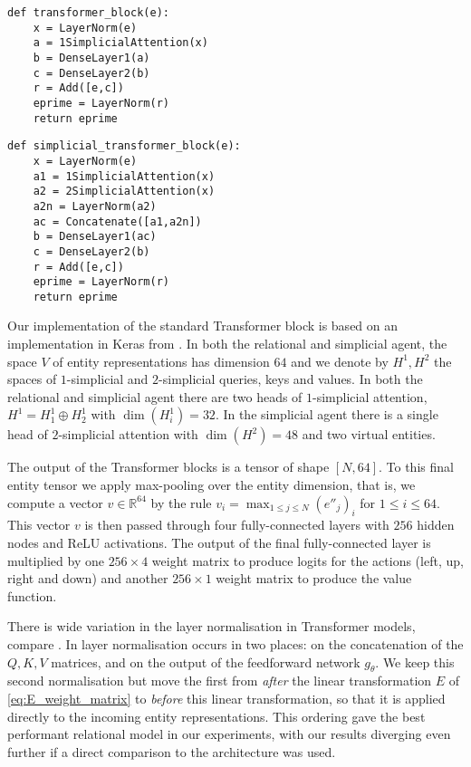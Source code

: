\documentclass{article} %
\begin{document}
\vspace{-2ex}
\begin{minipage}[t]{7cm}
{\small{
\begin{lstlisting}
def transformer_block(e):
    x = LayerNorm(e)
    a = 1SimplicialAttention(x)
    b = DenseLayer1(a) 
    c = DenseLayer2(b)
    r = Add([e,c])
    eprime = LayerNorm(r)
    return eprime
\end{lstlisting}
}}  
\end{minipage}
\begin{minipage}[t]{7cm}
{\small{
\begin{lstlisting}
def simplicial_transformer_block(e):
    x = LayerNorm(e)
    a1 = 1SimplicialAttention(x) 
    a2 = 2SimplicialAttention(x)
    a2n = LayerNorm(a2)
    ac = Concatenate([a1,a2n])
    b = DenseLayer1(ac) 
    c = DenseLayer2(b)
    r = Add([e,c])
    eprime = LayerNorm(r)
    return eprime
\end{lstlisting}
}}
\end{minipage}

Our implementation of the standard Transformer block is based on an implementation in Keras from \citep{kpot}. In both the relational and simplicial agent, the space $V$ of entity representations has dimension $64$ and we denote by $H^1, H^2$ the spaces of $1$-simplicial and $2$-simplicial queries, keys and values. In both the relational and simplicial agent there are two heads of $1$-simplicial attention, $H^1 = H^1_1 \oplus H^1_2$ with $\dim(H^1_{i}) = 32$. In the simplicial agent there is a single head of $2$-simplicial attention with $\dim(H^2) = 48$ and two virtual entities.

The output of the Transformer blocks is a tensor of shape $[N, 64]$. To this final entity tensor we apply max-pooling over the entity dimension, that is, we compute a vector $v \in \mathbb{R}^{64}$ by the rule $v_i = \max_{1 \le j \le N} (e''_j)_i$ for $1 \le i \le 64$. This vector $v$ is then passed through four fully-connected layers with $256$ hidden nodes and ReLU activations. The output of the final fully-connected layer is multiplied by one $256 \times 4$ weight matrix to produce logits for the actions (left, up, right and down) and another $256 \times 1$ weight matrix to produce the value function.

\begin{remark}\label{remark:layer_norms_dif} There is wide variation in the layer normalisation in Transformer models, compare \citep{attention, sparse, zambaldi}. In \citep{zambaldi} layer normalisation occurs in two places: on the concatenation of the $Q,K,V$ matrices, and on the output of the feedforward network $g_\theta$. We keep this second normalisation but move the first from \emph{after} the linear transformation $E$ of \eqref{eq:E_weight_matrix} to \emph{before} this linear transformation, so that it is applied directly to the incoming entity representations.  This ordering gave the best performant relational model in our experiments, with our results diverging even further if a direct comparison to the \citep{zambaldi} architecture was used.
\end{remark}
\end{document}
